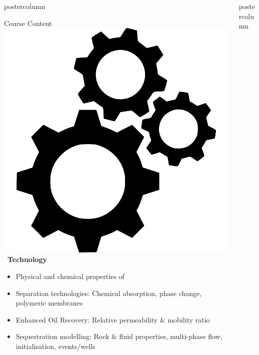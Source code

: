 \documentclass{beamer}
\newlength{\columnheight}
\begin{document}
\begin{frame}
\begin{columns}
\begin{column}{.382\textwidth}
\begin{beamercolorbox}[center]{postercolumn}
\begin{minipage}{.98\textwidth}
{\begin{myblock}{Course Content}
	\includegraphics[scale=0.1]{figures/icons/tech}~\textbf{Technology}
	\begin{itemize}
		\item Physical and chemical properties of 
		\item Separation technologies: Chemical absorption, phase change, polymeric membranes
		\item Enhanced Oil Recovery: Relative permeability \& mobility ratio
		\item Sequestration modelling: Rock \& fluid properties, multi-phase flow, initialisation, events/wells
	\end{itemize}
	
						
\end{myblock}
					
					
		}\end{minipage}\end{beamercolorbox}
	\end{column}



	\begin{column}{.618\textwidth}
		\begin{beamercolorbox}[center]{postercolumn}
			\begin{minipage}{.98\textwidth} %
				\parbox[t][\columnheight]{\textwidth}{ %








}
\end{minipage}
\end{beamercolorbox}
\end{column}
\end{columns}
\end{frame}
\end{document}
